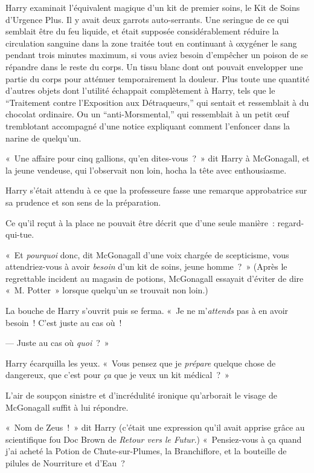 Harry examinait l'équivalent magique d'un kit de premier soins, le Kit de Soins d'Urgence Plus.
Il y avait deux garrots auto-serrants.
Une seringue de ce qui semblait être du feu liquide, et était supposée considérablement réduire la circulation sanguine dans la zone traitée tout en continuant à oxygéner le sang pendant trois minutes maximum, si vous aviez besoin d'empêcher un poison de se répandre dans le reste du corps.
Un tissu blanc dont ont pouvait envelopper une partie du corps pour atténuer temporairement la douleur.
Plus toute une quantité d'autres objets dont l'utilité échappait complètement à Harry, tels que le “Traitement contre l'Exposition aux Détraqueurs,” qui sentait et ressemblait à du chocolat ordinaire.
Ou un “anti-Morsmental,” qui ressemblait à un petit œuf tremblotant accompagné d'une notice expliquant comment l'enfoncer dans la narine de quelqu'un.

«~Une affaire pour cinq gallions, qu'en dites-vous~?~» dit Harry à McGonagall, et la jeune vendeuse, qui l'observait non loin, hocha la tête avec enthousiasme.

Harry s'était attendu à ce que la professeure fasse une remarque approbatrice sur sa prudence et son sens de la préparation.

Ce qu'il reçut à la place ne pouvait être décrit que d'une seule manière~: regard-qui-tue.

«~Et \emph{pourquoi} donc, dit McGonagall d'une voix chargée de scepticisme, vous attendriez-vous à avoir \emph{besoin} d'un kit de soins, jeune homme~?~»
(Après le regrettable incident au magasin de potions, McGonagall essayait d'éviter de dire «~M. Potter~» lorsque quelqu'un se trouvait non loin.)

La bouche de Harry s'ouvrit puis se ferma.
«~Je ne m'\emph{attends} pas à en avoir besoin~! C'est juste au cas où~!

--- Juste au cas où \emph{quoi}~?~»

Harry écarquilla les yeux. «~Vous pensez que je \emph{prépare} quelque chose de dangereux, que c'est pour \emph{ça} que je veux un kit médical~?~»



L'air de soupçon sinistre et d'incrédulité ironique qu'arborait le visage de McGonagall suffit à lui répondre.

«~Nom de Zeus~!~» dit Harry (c'était une expression qu'il avait apprise grâce au scientifique fou Doc Brown de \emph{Retour vers le Futur}.) «~Pensiez-vous à ça quand j'ai acheté la Potion de Chute-sur-Plumes, la Branchiflore, et la bouteille de pilules de Nourriture et d'Eau~?

